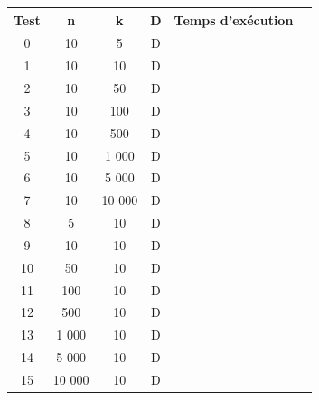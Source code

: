 \documentclass[a4paper, titlepage]{article}
\begin{document}
		\begin{center}
		\begin{tabular}{|c|c|c|c|r|r|}
			\hline
			Test	& n	& k	& D	& Temps d'exécution \\
			\hline
			0		& 10 & 5 & D & \\
			1		& 10 & 10 & D & \\
			2		& 10 & 50 & D & \\
			3		& 10 & 100 & D & \\
			4		& 10 & 500 & D & \\
			5		& 10 & 1 000 & D & \\
			6		& 10 & 5 000 & D & \\
			7		& 10 & 10 000 & D & \\
			\hline
			8		& 5 & 10 & D & \\
			9		& 10 & 10 & D & \\
			10		& 50 & 10 & D & \\
			11		& 100 & 10 & D & \\
			12		& 500 & 10 & D & \\
			13		& 1 000 & 10 & D & \\
			14		& 5 000 & 10 & D & \\
			15		& 10 000 & 10 & D & \\
			\hline
		\end{tabular}
		\end{center}
		
\end{document}
